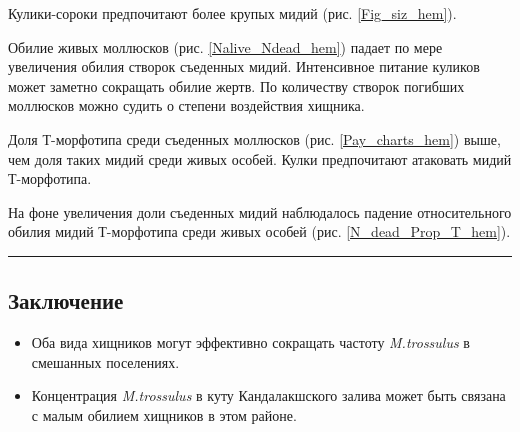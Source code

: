 \documentclass[20pt,a0,portrait]{a0poster}
\begin{document}
\begin{minipage}[t]{0.5\linewidth}
\begin{minipage}[t]{0.46\linewidth}
\begin{center}
			\label{N_dead_Prop_T_hem}
		\end{center}
\end{minipage}\vspace{0.5cm}


\vspace{\belowdisplayskip}
Кулики-сороки предпочитают более крупых мидий (рис. \ref{Fig_siz_hem}).

Обилие живых моллюсков (рис. \ref{Nalive_Ndead_hem}) падает по мере увеличения обилия створок съеденных мидий. Интенсивное питание куликов может заметно сокращать обилие жертв. По количеству створок погибших моллюсков можно судить о степени воздействия хищника.

Доля Т-морфотипа среди съеденных моллюсков (рис.  \ref{Pay_charts_hem}) выше, чем доля таких мидий среди живых особей. Кулки предпочитают атаковать мидий Т-морфотипа. 

На фоне увеличения доли съеденных мидий наблюдалось падение относительного обилия мидий Т-морфотипа среди живых особей (рис. \ref{N_dead_Prop_T_hem}).

\end{minipage}





%
%

		\color{SaddleBrown} %

\vspace{0.4cm}

\rule{0.5\linewidth}{4pt}

\begin{minipage}[t][4cm][t]{\textwidth}
		\subsection*{Заключение}

		\begin{itemize}
			\item Оба вида хищников могут эффективно сокращать частоту \emph{M.trossulus} в смешанных поселениях.
			\item Концентрация \emph{M.trossulus} в куту Кандалакшского залива может быть связана с малым обилием хищников в этом районе.
		\end{itemize}

		\color{DarkSlateGray} %
\end{minipage}
\end{document}
